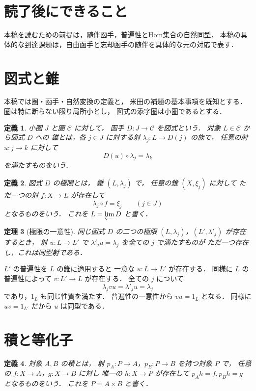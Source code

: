 \documentclass[a5paper,10pt,onecolumn]{jsarticle}
\makeatletter
\theoremstyle{mathnotetheorem}
\newtheorem{theorem}{定理}[section]
\newtheorem{definition}[theorem]{定義}
\renewcommand{\proofname}{証明}
\renewenvironment{proof}[1][\proofname]{%
  \par\pushQED{\qed}\normalfont\topsep4\p@\@plus2\p@\relax
  \trivlist\item[\hskip\labelsep\bfseries #1]\ignorespaces
}{\popQED\endtrivlist\@endpefalse}
\makeatother
\begin{document}
\section*{読了後にできること}
本稿を読むための前提は，随伴函手，普遍性とHom集合の自然同型．
本稿の具体的な到達課題は，自由函手と忘却函手の随伴を具体的な元の対応で表す．

\section{図式と錐}

本稿では圏・函手・自然変換の定義と，
米田の補題の基本事項を既知とする．
圏は特に断らない限り局所小とし，
図式の添字圏は小圏であるとする．

\begin{definition}
小圏 $J$ と圏 $\mathcal C$ に対して，
函手 $D:J\to\mathcal C$ を\emph{図式}という．
対象 $L\in\mathcal C$ から図式 $D$ への
\emph{錐}とは，各 $j\in J$ に対する射
$\lambda_j:L\to D(j)$ の族で，
任意の射 $u:j\to k$ に対して
\[
 D(u)\circ\lambda_j=\lambda_k
\]
を満たすものをいう．
\end{definition}

\begin{definition}
図式 $D$ の\emph{極限}とは，
錐 $(L,\lambda_j)$ で，
任意の錐 $(X,\xi_j)$ に対して
ただ一つの射 $f:X\to L$ が存在して
\[
 \lambda_j\circ f=\xi_j\qquad(j\in J)
\]
となるものをいう．
これを $L=\varprojlim D$ と書く．
\end{definition}

\begin{theorem}[極限の一意性]\label{thm:limit-unique}
同じ図式 $D$ の二つの極限
$(L,\lambda_j)$，$(L',\lambda'_j)$ が存在するとき，
射 $u:L\to L'$ で
$\lambda'_j u=\lambda_j$ を全ての $j$ で満たすものが
ただ一つ存在し，これは同型射である．
\end{theorem}
\begin{proof}
$L'$ の普遍性を $L$ の錐に適用すると
一意な $u:L\to L'$ が存在する．
同様に $L$ の普遍性によって
$v:L'\to L$ が存在する．
全ての $j$ について
\[
 \lambda_j vu=\lambda'_j u=\lambda_j
\]
であり，$1_L$ も同じ性質を満たす．
普遍性の一意性から $vu=1_L$ となる．
同様に $uv=1_{L'}$ だから $u$ は同型である．
\end{proof}

\section{積と等化子}

\begin{definition}
対象 $A,B$ の\emph{積}とは，
射 $p_A:P\to A$，$p_B:P\to B$ を持つ対象 $P$ で，
任意の $f:X\to A$，$g:X\to B$ に対し
唯一の $h:X\to P$ が存在して
$p_Ah=f,p_Bh=g$ となるものをいう．
これを $P=A\times B$ と書く．
\end{definition}
\end{document}

